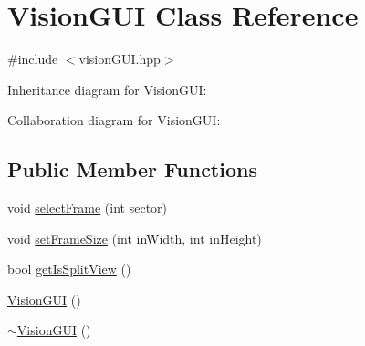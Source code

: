\hypertarget{class_vision_g_u_i}{}\section{Vision\+G\+UI Class Reference}
\label{class_vision_g_u_i}


{\ttfamily \#include $<$vision\+G\+U\+I.\+hpp$>$}



Inheritance diagram for Vision\+G\+UI\+:


Collaboration diagram for Vision\+G\+UI\+:
\subsection*{Public Member Functions}
\begin{DoxyCompactItemize}
\item 
void \hyperlink{class_vision_g_u_i_a26659931ea77f5b975fe1d0ce101c74c}{select\+Frame} (int sector)
\item 
void \hyperlink{class_vision_g_u_i_afd0b5f34c6a9691ab2fe83c49abae95a}{set\+Frame\+Size} (int in\+Width, int in\+Height)
\item 
bool \hyperlink{class_vision_g_u_i_a2d3a0e0b04ac1b80070e9123ec354d83}{get\+Is\+Split\+View} ()
\item 
\hyperlink{class_vision_g_u_i_ae6e821e61b7cf4e0aada2044a2bd2aca}{Vision\+G\+UI} ()
\item 
\hyperlink{class_vision_g_u_i_ae4892f8f0cff14a0d65ee55261b08999}{$\sim$\+Vision\+G\+UI} ()
\end{DoxyCompactItemize}
